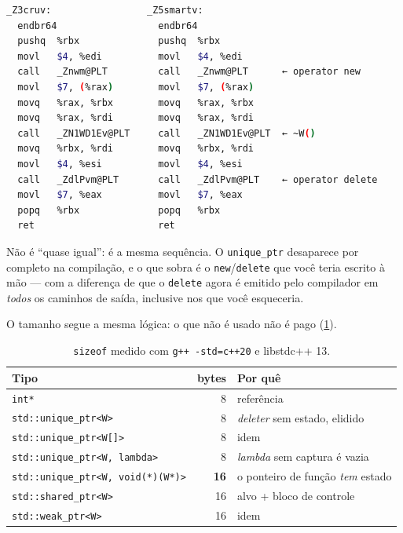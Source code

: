 \begin{lstlisting}[style=bt, language=bash,
    caption={\texttt{g++ -O2 -S}: a sequência de instruções das duas funções é
             idêntica, instrução por instrução --- 14 cada.}]
_Z3cruv:                 _Z5smartv:
  endbr64                  endbr64
  pushq  %rbx              pushq  %rbx
  movl   $4, %edi          movl   $4, %edi
  call   _Znwm@PLT         call   _Znwm@PLT      ← operator new
  movl   $7, (%rax)        movl   $7, (%rax)
  movq   %rax, %rbx        movq   %rax, %rbx
  movq   %rax, %rdi        movq   %rax, %rdi
  call   _ZN1WD1Ev@PLT     call   _ZN1WD1Ev@PLT  ← ~W()
  movq   %rbx, %rdi        movq   %rbx, %rdi
  movl   $4, %esi          movl   $4, %esi
  call   _ZdlPvm@PLT       call   _ZdlPvm@PLT    ← operator delete
  movl   $7, %eax          movl   $7, %eax
  popq   %rbx              popq   %rbx
  ret                      ret
\end{lstlisting}

Não é ``quase igual'': é a mesma sequência. O \texttt{unique\_ptr} desaparece
por completo na compilação, e o que sobra é o \texttt{new}/\texttt{delete} que
você teria escrito à mão --- com a diferença de que o \texttt{delete} agora é
emitido pelo compilador em \emph{todos} os caminhos de saída, inclusive nos que
você esqueceria.

O tamanho segue a mesma lógica: o que não é usado não é pago
(\cref{tab:sp-sizeof}).

\begin{table}[htbp]
\centering
\caption{\texttt{sizeof} medido com \texttt{g++ -std=c++20} e libstdc++ 13.}
\label{tab:sp-sizeof}
\footnotesize
\begin{tabular}{@{}lrl@{}}
\toprule
\textbf{Tipo} & \textbf{bytes} & \textbf{Por quê} \\
\midrule
\texttt{int*}                              &  8 & referência \\
\texttt{std::unique\_ptr<W>}               &  8 & \emph{deleter} sem estado, elidido \\
\texttt{std::unique\_ptr<W[]>}             &  8 & idem \\
\texttt{std::unique\_ptr<W, lambda>}       &  8 & \emph{lambda} sem captura é vazia \\
\texttt{std::unique\_ptr<W, void(*)(W*)>}  & \textbf{16} & o ponteiro de função \emph{tem} estado \\
\texttt{std::shared\_ptr<W>}               & 16 & alvo + bloco de controle \\
\texttt{std::weak\_ptr<W>}                 & 16 & idem \\
\bottomrule
\end{tabular}
\end{table}


